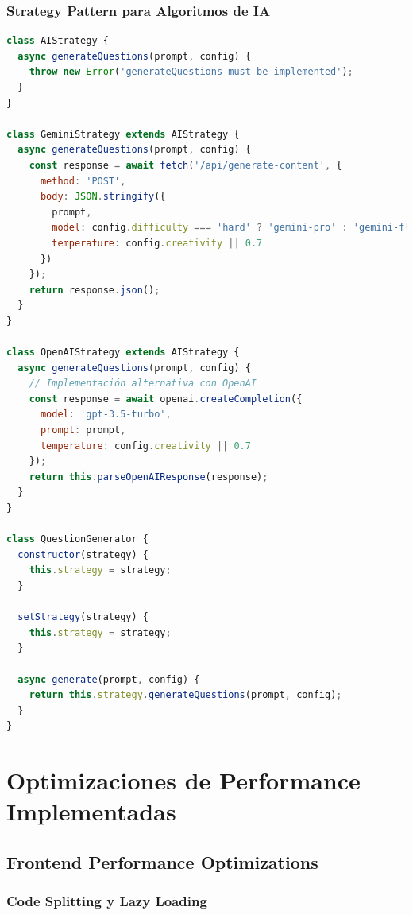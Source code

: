 \documentclass[12pt,a4paper]{report}
\begin{document}
\subsubsection{Strategy Pattern para Algoritmos de IA}

\begin{lstlisting}[language=JavaScript, caption=Strategy pattern para diferentes estrategias de IA]
class AIStrategy {
  async generateQuestions(prompt, config) {
    throw new Error('generateQuestions must be implemented');
  }
}

class GeminiStrategy extends AIStrategy {
  async generateQuestions(prompt, config) {
    const response = await fetch('/api/generate-content', {
      method: 'POST',
      body: JSON.stringify({
        prompt,
        model: config.difficulty === 'hard' ? 'gemini-pro' : 'gemini-flash',
        temperature: config.creativity || 0.7
      })
    });
    return response.json();
  }
}

class OpenAIStrategy extends AIStrategy {
  async generateQuestions(prompt, config) {
    // Implementación alternativa con OpenAI
    const response = await openai.createCompletion({
      model: 'gpt-3.5-turbo',
      prompt: prompt,
      temperature: config.creativity || 0.7
    });
    return this.parseOpenAIResponse(response);
  }
}

class QuestionGenerator {
  constructor(strategy) {
    this.strategy = strategy;
  }
  
  setStrategy(strategy) {
    this.strategy = strategy;
  }
  
  async generate(prompt, config) {
    return this.strategy.generateQuestions(prompt, config);
  }
}
\end{lstlisting}

\section{Optimizaciones de Performance Implementadas}

\subsection{Frontend Performance Optimizations}

\subsubsection{Code Splitting y Lazy Loading}
\end{document}
